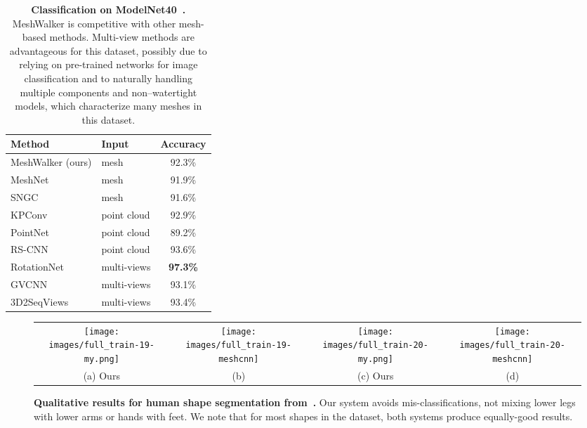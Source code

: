 \documentclass[acmtog]{acmart}
\begin{document}
\begin{table}[htb]\caption{{\bf Classification on ModelNet40~\cite{wu20153d}.}
MeshWalker is competitive with other mesh-based methods. 
Multi-view methods  are advantageous for this dataset, possibly due to relying on pre-trained networks for image classification and to naturally handling multiple components and non--watertight models, which characterize many meshes in this dataset.
}
\begin{center}
 \begin{tabular}{||l l c||} 
 \hline
 Method & Input & Accuracy \\ [0.5ex] 
 \hline\hline\hline
 MeshWalker (ours) & mesh & 92.3\% \\ 
 \hline
 MeshNet~\cite{feng2019meshnet} & mesh & 91.9\% \\
 \hline
 SNGC~\cite{haim2019surface} & mesh & 91.6\%  \\
 \hline
 \hline
 KPConv~\cite{thomas2019kpconv} & point cloud & 92.9\% \\
 \hline
 PointNet~\cite{qi2017pointnet} & point cloud & 89.2\%  \\
 \hline
 RS-CNN~\cite{liu2019relation} & point cloud & 93.6\% \\
 \hline
 \hline
 RotationNet~\cite{kanezaki2018rotationnet} & multi-views & \textbf{97.3\%} \\
 \hline
 GVCNN~\cite{feng2018gvcnn} & multi-views & 93.1\% \\
 \hline
 3D2SeqViews~\cite{han20193d2seqviews} & multi-views & 93.4\% \\
 \hline
\end{tabular}
\label{tbl:modelnet}
\end{center}
\end{table}


\begin{figure*}[tb]
\centering
\begin{tabular}{cccc}
\texttt{[image: images/full\_train-19-my.png]}&
\texttt{[image: images/full\_train-19-meshcnn]}&
\texttt{[image: images/full\_train-20-my.png]}&
\texttt{[image: images/full\_train-20-meshcnn]}\\
(a) Ours & (b) \cite{hanocka2019meshcnn} & (c) Ours & (d) \cite{hanocka2019meshcnn}
\end{tabular}
\caption{{\bf Qualitative results for human shape segmentation from~\cite{maron2017convolutional}. }
Our system avoids mis-classifications, not mixing lower legs with lower arms or hands with feet.
We note that for most shapes in the dataset, both systems produce equally-good results.
}
\label{fig:human_body_seg_visualization}
\end{figure*}
\end{document}
